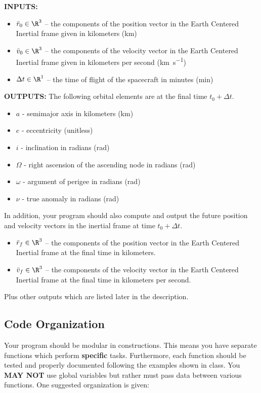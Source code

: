 \documentclass[11pt, reqno]{article}    %
\begin{document}
\noindent \textbf{INPUTS:}
\begin{itemize}
    \item \( \bar r_0 \in \R^{3} \) -- the components of the position vector in the Earth Centered Inertial frame given in kilometers (\si{\kilo\meter})
    \item \( \bar v_0 \in \R^{3} \) -- the components of the velocity vector in the Earth Centered Inertial frame given in kilometers per second (\si{\kilo\meter\per\second})
    \item \( \Delta t \in \R^{1} \) -- the time of flight of the spacecraft in minutes (\si{\minute})
\end{itemize}

\noindent \textbf{OUTPUTS:}
The following orbital elements are at the final time \( t_0 + \Delta t \).
\begin{itemize}
    \item \( a \)  - semimajor axis in kilometers (\si{\kilo\meter})
    \item \( e \) - eccentricity (unitless)
    \item \( i \) - inclination in radians (\si{\radian})
    \item \( \Omega \) - right ascension of the ascending node in radians (\si{\radian})
    \item \( \omega \) - argument of perigee in radians (\si{\radian})
    \item \( \nu \) - true anomaly in radians (\si{\radian})
\end{itemize}
In addition, your program should also compute and output the future position and velocity vectors in the inertial frame at time \( t_0 + \Delta t \).
\begin{itemize}
    \item \( \bar r_f \in \R^3 \) -- the components of the position vector in the Earth Centered Inertial frame at the final time in kilometers.
    \item \( \bar v_f \in \R^3 \) -- the components of the velocity vector in the Earth Centered Inertial frame at the final time in kilometers per second.
\end{itemize}

Plus other outputs which are listed later in the description.

\subsection*{Code Organization} 
Your program should be modular in constructions. 
This means you have separate functions which perform \textbf{specific} tasks.
Furthermore, each function should be tested and properly documented following the examples shown in class.
You \textbf{MAY NOT}  use global variables but rather must pass data between various functions.
One suggested organization is given:
\end{document}
